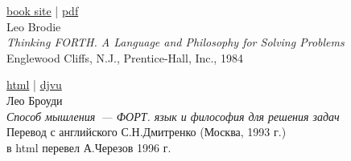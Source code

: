 \begin{thebibliography}{}
 
    \href{http://thinking-forth.sourceforge.net/}{book site}
    | \href{https://github.com/ponyatov/RDW/releases/download/051021-544b/thinking-forth-color.pdf}{pdf}\\
    Leo Brodie\\
    \emph{Thinking FORTH. A Language and Philosophy for Solving Problems}\\
    Englewood Cliffs, N.J., Prentice-Hall, Inc., 1984

    \href{http://www.enet.ru/win/cherezov/brodie1.html}{html}
    | \href{https://github.com/ponyatov/RDW/releases/download/051021-544b/Thinking_ru.djvu}{djvu}\\
    Лео Броуди\\
    \emph{Способ мышления\ --- ФОРТ. язык и философия для решения задач}\\
    Перевод с английского С.Н.Дмитренко (Москва, 1993 г.)\\
    в html перевел А.Черезов 1996 г.

\end{thebibliography}

